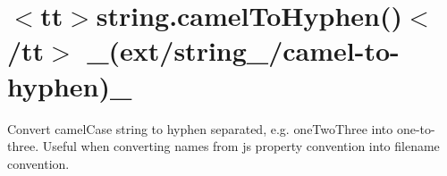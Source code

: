 \chapter{\texorpdfstring{$<$}{<}tt\texorpdfstring{$>$}{>}string.\+camel\+To\+Hyphen()\texorpdfstring{$<$}{<}/tt\texorpdfstring{$>$}{>} \+\_\+(ext/string\+\_\+/camel-\/to-\/hyphen)\+\_\+}
\hypertarget{md__2home_2solype_2delivery_2current__days_2Mannheim_2front_2node__modules_2ext_2docs_2string___2camel-to-hyphen}{}\label{md__2home_2solype_2delivery_2current__days_2Mannheim_2front_2node__modules_2ext_2docs_2string___2camel-to-hyphen}
\label{md__2home_2solype_2delivery_2current__days_2Mannheim_2front_2node__modules_2ext_2docs_2string___2camel-to-hyphen_autotoc_md2581}%
%
 Convert camel\+Case string to hyphen separated, e.\+g. {\ttfamily one\+Two\+Three} into {\ttfamily one-\/to-\/three}. Useful when converting names from js property convention into filename convention.


\begin{DoxyCode}{0}
\DoxyCodeLine{}

\end{DoxyCode}
 